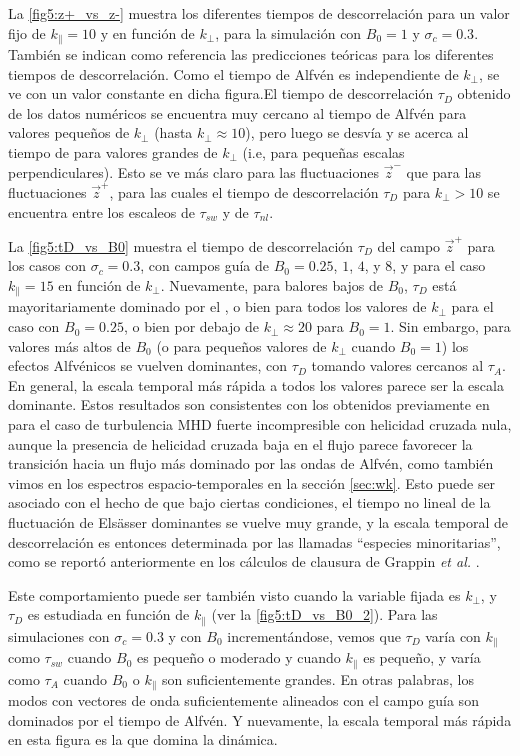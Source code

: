 La \cref{fig5:z+_vs_z-} muestra los diferentes tiempos de
descorrelación para un valor fijo de $k_{\parallel}=10$ y en función
de $k_{\perp}$, para la simulación con $B_0=1$ y
$\sigma_c=0.3$. También se indican como referencia las predicciones
teóricas para los diferentes tiempos de descorrelación. Como el tiempo
de Alfvén es independiente de $k_{\perp}$, se ve con un valor
constante en dicha figura.El tiempo de descorrelación $\tau_D$
obtenido de los datos numéricos se encuentra muy cercano al tiempo de
Alfvén para valores pequeños de $k_{\perp}$ (hasta $k_\perp \approx
10$), pero luego se desvía y se acerca al tiempo de \sweeping para
valores grandes de $k_{\perp}$ (i.e, para pequeñas escalas
perpendiculares). Esto se ve más claro para las fluctuaciones
$\vec{z}^-$ que para las fluctuaciones $\vec{z}^+$, para las cuales el
tiempo de descorrelación $\tau_D$ para $k_\perp > 10$ se encuentra
entre los escaleos de $\tau_{sw}$ y de $\tau_{nl}$.

La \cref{fig5:tD_vs_B0} muestra el tiempo de descorrelación $\tau_D$
del campo $\vec{z}^+$ para los casos con $\sigma_c = 0.3$, con campos
guía de $B_0=0.25$, $1$, $4$, y $8$, y para el caso $k_\parallel = 15$
en función de $k_\perp$.  Nuevamente, para balores bajos de $B_0$,
$\tau_D$ está mayoritariamente dominado por el \sweeping, o bien para
todos los valores de $k_\perp$ para el caso con $B_0=0.25$, o bien por
debajo de $k_\perp \approx 20$ para $B_0=1$. Sin embargo, para valores
más altos de $B_0$ (o para pequeños valores de $k_\perp$ cuando
$B_0=1$) los efectos Alfvénicos se vuelven dominantes, con $\tau_D$
tomando valores cercanos al $\tau_{A}$. En general, la escala temporal
más rápida a todos los valores parece ser la escala dominante. Estos
resultados son consistentes con los obtenidos previamente en
\cite{lugones_2016_spatiotemporal} para el caso de turbulencia MHD
fuerte incompresible con helicidad cruzada nula, aunque la presencia
de helicidad cruzada baja en el flujo parece favorecer la transición
hacia un flujo más dominado por las ondas de Alfvén, como también
vimos en los espectros espacio-temporales en la sección
\ref{sec:wk}. Esto puede ser asociado con el hecho de que bajo ciertas
condiciones, el tiempo no lineal de la fluctuación de Els\"asser
dominantes se vuelve muy grande, y la escala temporal de
descorrelación es entonces determinada por las llamadas ``especies
minoritarias'', como se reportó anteriormente en los cálculos de
clausura de Grappin \textit{et al.} \cite{grappin_1983_dependence}.

Este comportamiento puede ser también visto cuando la variable fijada
es $k_\perp$, y $\tau_D$ es estudiada en función de $k_\parallel$ (ver
la \cref{fig5:tD_vs_B0_2}). Para las simulaciones con $\sigma_c=0.3$ y
con $B_0$ incrementándose, vemos que $\tau_D$ varía con $k_\parallel$
como $\tau_{sw}$ cuando $B_0$ es pequeño o moderado y cuando
$k_\parallel$ es pequeño, y varía como $\tau_A$ cuando $B_0$ o
$k_\parallel$ son suficientemente grandes. En otras palabras, los
modos con vectores de onda suficientemente alineados con el campo guía
son dominados por el tiempo de Alfvén. Y nuevamente, la escala
temporal más rápida en esta figura es la que domina la dinámica.

